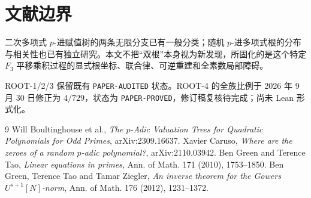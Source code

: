 \documentclass[11pt,a4paper]{ctexart}
\begin{document}
\section{文献边界}
二次多项式 \(p\)-进赋值树的两条无限分支已有一般分类；随机 \(p\)-进多项式根的分布与相关性也已有独立研究。本文不把“双根”本身视为新发现，所固化的是这个特定 \(F_3\) 平移乘积过程的显式根坐标、联合律、可逆重建和全素数局部障碍。

ROOT-1/2/3 保留既有 \texttt{PAPER-AUDITED} 状态。ROOT-4 的全族比例于 2026 年 9 月 30 日修正为 $4/729$，状态为 \texttt{PAPER-PROVED}，修订稿复核待完成；尚未 Lean 形式化。

\begin{thebibliography}{9}
 Will Boultinghouse et al., \emph{The \(p\)-Adic Valuation Trees for Quadratic Polynomials for Odd Primes}, arXiv:2309.16637.
 Xavier Caruso, \emph{Where are the zeroes of a random \(p\)-adic polynomial?}, arXiv:2110.03942.
 Ben Green and Terence Tao, \emph{Linear equations in primes}, Ann. of Math. 171 (2010), 1753--1850.
 Ben Green, Terence Tao and Tamar Ziegler, \emph{An inverse theorem for the Gowers \(U^{s+1}[N]\)-norm}, Ann. of Math. 176 (2012), 1231--1372.
\end{thebibliography}
\end{document}
